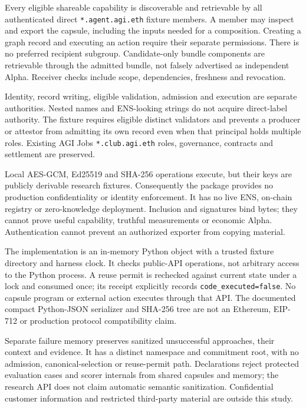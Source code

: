 \documentclass[11pt,letterpaper]{article}
\begin{document}
Every eligible shareable capability is discoverable and retrievable by all
authenticated direct \texttt{*.agent.agi.eth} fixture members. A member may inspect
and export the capsule, including the inputs needed for a composition. Creating
a graph record and executing an action require their separate permissions.
There is no preferred recipient subgroup. Candidate-only bundle components are
retrievable through the admitted bundle, not falsely advertised as independent
Alpha. Receiver checks include scope, dependencies, freshness and revocation.

Identity, record writing, eligible validation, admission and execution are
separate authorities. Nested names and ENS-looking strings do not acquire
direct-label authority. The fixture requires eligible distinct validators and
prevents a producer or attestor from admitting its own record even when that
principal holds multiple roles. Existing AGI Jobs \texttt{*.club.agi.eth} roles,
governance, contracts and settlement are preserved.

Local AES-GCM, Ed25519 and SHA-256 operations execute, but their keys are publicly
derivable research fixtures. Consequently the package provides no production
confidentiality or identity enforcement. It has no live ENS, on-chain registry
or zero-knowledge deployment. Inclusion and signatures bind bytes; they cannot
prove useful capability, truthful measurements or economic Alpha. Authentication
cannot prevent an authorized exporter from copying material.

The implementation is an in-memory Python object with a trusted fixture
directory and harness clock. It checks public-API operations, not arbitrary
access to the Python process. A reuse permit is rechecked against current state
under a lock and consumed once; its receipt explicitly records
\texttt{code\_executed=false}. No capsule program or external action executes
through that API. The documented compact Python-JSON serializer and SHA-256
tree are not an Ethereum, EIP-712 or production protocol compatibility claim.

Separate failure memory preserves sanitized unsuccessful approaches, their
context and evidence. It has a distinct namespace and commitment root, with no
admission, canonical-selection or reuse-permit path. Declarations reject
protected evaluation cases and scorer internals from shared capsules and memory;
the research API does not claim automatic semantic sanitization. Confidential
customer information and restricted third-party material are outside this study.
\end{document}

